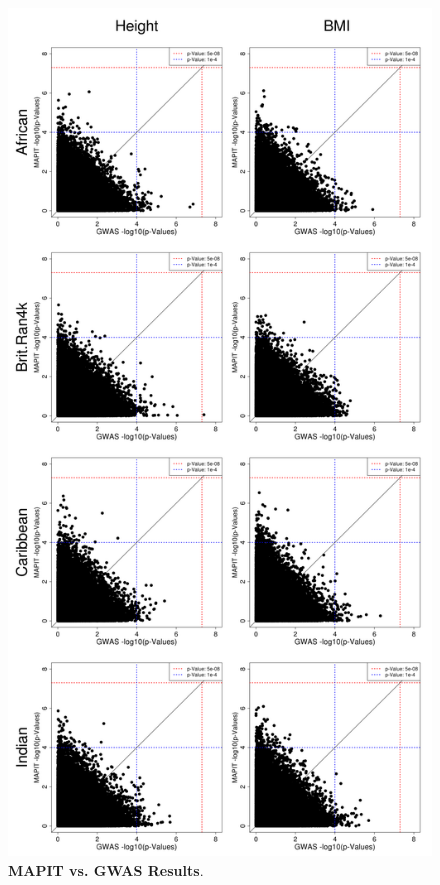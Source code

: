\documentclass[12pt, a4paper]{article}
\begin{document}
\begin{figure}[htbp]
\centering
\hspace*{-.75cm}
\includegraphics[scale=.3]{Images/Supp/InterPath_Supp_Figure_MAPITvsGWAS_vs2.png}
\caption[TBD]{\textbf{MAPIT vs. GWAS Results}.}
\label{InterPath-Supp-Figure-MAPITvsGWAS}
\end{figure}
\clearpage
\end{document}
